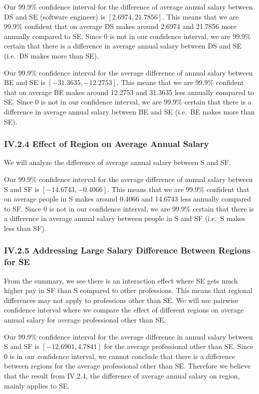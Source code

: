 \documentclass[
]{article}
\begin{document}
Our 99.9\% confidence interval for the difference of average annual
salary between DS and SE (software engineer) is \([2.6974, 21.7856]\).
This means that we are 99.9\% confident that on average DS makes around
2.6974 and 21.7856 more annually compared to SE. Since 0 is not in our
confidence interval, we are 99.9\% certain that there is a difference in
average annual salary between DS and SE (i.e.~DS makes more than SE).

Our 99.9\% confidence interval for the average difference of annual
salary between BE and SE is \([-31.3635, -12.2753]\). This means that we
are 99.9\% confident that on average BE makes around 12.2753 and 31.3635
less annually compared to SE. Since 0 is not in our confidence interval,
we are 99.9\% certain that there is a difference in average annual
salary between BE and SE (i.e.~BE makes more than SE).

\subsubsection{IV.2.4 Effect of Region on Average Annual
Salary}\label{iv.2.4-effect-of-region-on-average-annual-salary}

We will analyze the difference of average annual salary between S and
SF.

Our 99.9\% confidence interval for the average difference of annual
salary between S and SF is \([-14.6743, -0.4066]\). This means that we
are 99.9\% confident that on average people in S makes around 0.4066 and
14.6743 less annually compared to SF. Since 0 is not in our confidence
interval, we are 99.9\% certain that there is a difference in average
annual salary between people in S and SF (i.e.~S makes less than SF).

\subsubsection{IV.2.5 Addressing Large Salary Difference Between Regions
for
SE}\label{iv.2.5-addressing-large-salary-difference-between-regions-for-se}

From the summary, we see there is an interaction effect where SE gets
much higher pay in SF than S compared to other professions. This means
that regional differences may not apply to professions other than SE. We
will use pairwise confidence interval where we compare the effect of
different regions on average annual salary for average professional
other than SE.

Our 99.9\% confidence interval for the average difference in annual
salary between S and SF is \([-12.6901, 4.7841]\) for the average
professional other than SE. Since 0 is in our confidence interval, we
cannot conclude that there is a difference between regions for the
average professional other than SE. Therefore we believe that the result
from IV.2.4, the difference of average annual salary on region, mainly
applies to SE.
\end{document}

